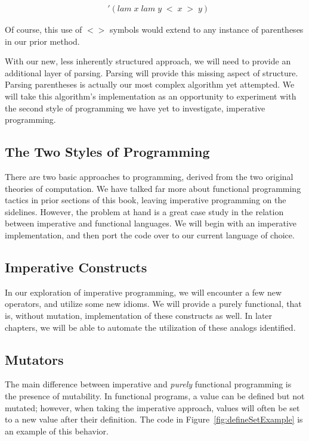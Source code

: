 \begin{figure}[htp]
\caption{}\label{fig:flatInputExample}
\begin{align*}
& '(lam \; x \; lam \; y \; < \; x \; > \; y)
\end{align*}
\end{figure}

Of course, this use of $<>$ symbols would extend to any instance of parentheses 
in our prior method.

With our new, less inherently structured approach, we will need to provide an 
additional layer of parsing. Parsing will provide this missing aspect of structure. 
Parsing parentheses is actually our most complex algorithm yet attempted. We will 
take this algorithm's implementation as an opportunity to experiment with the 
second style of programming we have yet to investigate, imperative programming.

\subsection{The Two Styles of Programming}
There are two basic approaches to programming, derived from the two original 
theories of computation. We have talked far more about functional programming 
tactics in prior sections of this book, leaving imperative programming on the 
sidelines. However, the problem at hand is a great case study in the relation 
between imperative and functional languages. We will begin with an imperative 
implementation, and then port the code over to our current language of choice.

\subsection{Imperative Constructs}
In our exploration of imperative programming, we will encounter a few new operators, 
and utilize some new idioms. We will provide a purely functional, that is, without
mutation, implementation of these constructs as well. In later chapters, we will be
able to automate the utilization of these analogs identified.

\subsection{Mutators}
The main difference between imperative and \emph{purely} functional programming is
the presence of mutability. In functional programs, a value can be defined but
not mutated; however, when taking the imperative approach, values will often be
set to a new value after their definition. The code in
Figure~\ref{fig:defineSetExample} is an example of this behavior.


